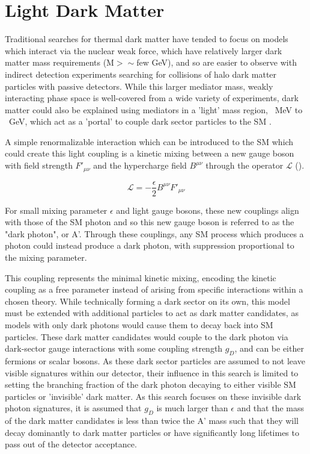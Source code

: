 \section{Light Dark Matter}
Traditional searches for thermal dark matter have tended to focus on models which interact via the nuclear weak force, which have relatively larger dark matter mass requirements (M$>\sim$few GeV), and so are easier to observe with indirect detection experiments searching for collisions of halo dark matter particles with passive detectors.
While this larger mediator mass, weakly interacting phase space is well-covered from a wide variety of experiments, dark matter could also be explained using mediators in a 'light' mass region, ~MeV to ~GeV, which act as a 'portal' to couple dark sector particles to the SM \cite{darkSectors}.

A simple renormalizable interaction which can be introduced to the SM which could create this light coupling is a kinetic mixing between a new gauge boson with field strength $F'_{\mu\nu}$ and the hypercharge field $B^{\mu\nu}$ through the operator $\mathcal{L}$ (). 

\begin{equation}
	\label{eq:LDMlagrangian}
	\mathcal{L} = - \frac{\epsilon}{2} B^{\mu\nu}F'_{\mu\nu}
\end{equation}

For small mixing parameter $\epsilon$ and light gauge bosons, these new couplings align with those of the SM photon \cite{Bauer_2018} and so this new gauge boson is referred to as the "dark photon", or A'.
Through these couplings, any SM process which produces a photon could instead produce a dark photon, with suppression proportional to the mixing parameter.

This coupling represents the minimal kinetic mixing, encoding the kinetic coupling as a free parameter instead of arising from specific interactions within a chosen theory. 
While technically forming a dark sector on its own, this model must be extended with additional particles to act as dark matter candidates, as models with only dark photons would cause them to decay back into SM particles.
These dark matter candidates would couple to the dark photon via dark-sector gauge interactions with some coupling strength $g_D$, and can be either fermions or scalar bosons.
As these dark sector particles are assumed to not leave visible signatures within our detector, their influence in this search is limited to setting the branching fraction of the dark photon decaying to either visible SM particles or 'invisible' dark matter.
As this search focuses on these invisible dark photon signatures, it is assumed that $g_D$ is much larger than $\epsilon$ and that the mass of the dark matter candidates is less than twice the A' mass such that they will decay dominantly to dark matter particles or have significantly long lifetimes to pass out of the detector acceptance.


